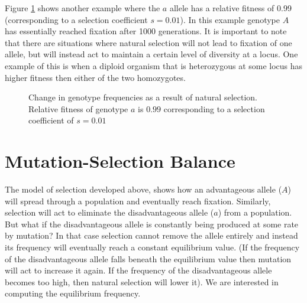 \documentclass[11pt,a4paper]{book}
\begin{document}
Figure \ref{FIGnatsel2} shows another example where the $a$ allele has a relative fitness of 0.99 (corresponding to a selection coefficient $s=0.01$). In this example genotype $A$ has essentially reached  fixation after 1000 generations. It is important to note that there are situations where natural selection will not lead to fixation of one allele, but will instead act to maintain a certain level of diversity at a locus. One example of this is when a diploid organism that is heterozygous at some locus has higher fitness then either of the two homozygotes. 

\begin{figure}[!t]
\begin{center}
\caption{\small Change in genotype frequencies as a result of natural selection. Relative fitness of genotype $a$ is $0.99$ corresponding to a selection coefficient of $s=0.01$}
\label{FIGnatsel2}
\end{center}
\end{figure}

\section{Mutation-Selection Balance\label{SECmutselbal}}

The model of selection developed above, shows how an advantageous allele ($A$) will spread through a population and eventually reach fixation. Similarly, selection will act to eliminate the disadvantageous allele ($a$) from a population. But what if the disadvantageous allele is constantly being produced at some rate by mutation?  In that case selection cannot remove the allele entirely and instead its frequency will eventually reach a constant equilibrium value. (If the frequency of the disadvantageous allele falls beneath the equilibrium value then mutation will act to increase it again. If the frequency of the disadvantageous  allele becomes too high, then natural selection will lower it). We are interested in computing the equilibrium  frequency. 
\end{document}
